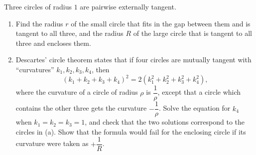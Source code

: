 Three circles of radius $1$ are pairwise externally tangent.
\begin{enumerate}
\item[(a)] Find the radius $r$ of the small circle that fits in the gap between them and is tangent to all three, and the radius $R$ of the large circle that is tangent to all three and encloses them.
\item[(b)] Descartes' circle theorem states that if four circles are mutually tangent with ``curvatures'' $k_1,k_2,k_3,k_4$, then
\[(k_1+k_2+k_3+k_4)^2=2\left(k_1^2+k_2^2+k_3^2+k_4^2\right),\]
where the curvature of a circle of radius $\rho$ is $\dfrac{1}{\rho}$, except that a circle which contains the other three gets the curvature $-\dfrac{1}{\rho}$. Solve the equation for $k_4$ when $k_1=k_2=k_3=1$, and check that the two solutions correspond to the circles in (a). Show that the formula would fail for the enclosing circle if its curvature were taken as $+\dfrac{1}{R}$.
\end{enumerate}
